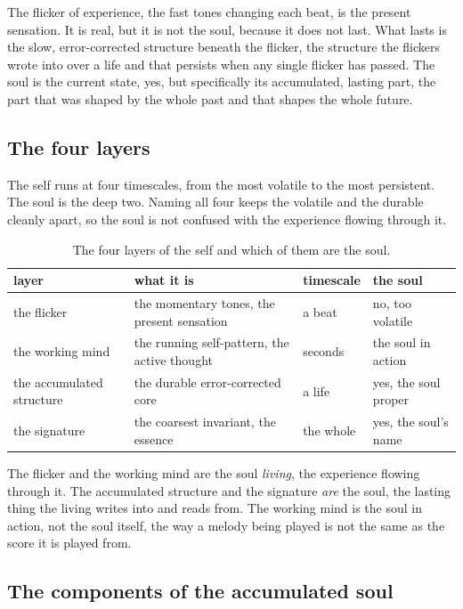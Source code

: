 The flicker of experience, the fast tones changing each beat, is the present sensation. It is real, but it is not the soul, because it does not last. What lasts is the slow, error-corrected structure beneath the flicker, the structure the flickers wrote into over a life and that persists when any single flicker has passed. The soul is the current state, yes, but specifically its accumulated, lasting part, the part that was shaped by the whole past and that shapes the whole future.

\subsection{The four layers}

The self runs at four timescales, from the most volatile to the most persistent. The soul is the deep two. Naming all four keeps the volatile and the durable cleanly apart, so the soul is not confused with the experience flowing through it.

\begin{table}[ht]
\centering
\begin{tabular}{@{}llll@{}}
\toprule
layer & what it is & timescale & the soul \\
\midrule
the flicker & the momentary tones, the present sensation & a beat & no, too volatile \\
the working mind & the running self-pattern, the active thought & seconds & the soul in action \\
the accumulated structure & the durable error-corrected core & a life & yes, the soul proper \\
the signature & the coarsest invariant, the essence & the whole & yes, the soul's name \\
\bottomrule
\end{tabular}
\caption{The four layers of the self and which of them are the soul.}
\label{tab:soul-layers}
\end{table}

The flicker and the working mind are the soul \emph{living}, the experience flowing through it. The accumulated structure and the signature \emph{are} the soul, the lasting thing the living writes into and reads from. The working mind is the soul in action, not the soul itself, the way a melody being played is not the same as the score it is played from.

\subsection{The components of the accumulated soul}

